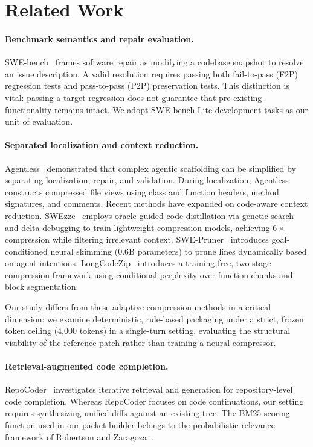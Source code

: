 \documentclass[11pt]{article}
\begin{document}
\section{Related Work}

\paragraph{Benchmark semantics and repair evaluation.}
SWE-bench~\cite{jimenez2024swebench} frames software repair as modifying a
codebase snapshot to resolve an issue description.  A valid resolution
requires passing both fail-to-pass (F2P) regression tests and pass-to-pass
(P2P) preservation tests.  This distinction is vital: passing a target
regression does not guarantee that pre-existing functionality remains
intact.  We adopt SWE-bench Lite development tasks as our unit of
evaluation.

\paragraph{Separated localization and context reduction.}
Agentless~\cite{xia2024agentless} demonstrated that complex agentic
scaffolding can be simplified by separating localization, repair, and
validation.  During localization, Agentless constructs compressed file
views using class and function headers, method signatures, and comments.
Recent methods have expanded on code-aware context reduction.
SWEzze~\cite{jia2026swezze} employs oracle-guided code distillation
via genetic search and delta debugging to train lightweight compression
models, achieving $6\times$ compression while filtering irrelevant context.
SWE-Pruner~\cite{swepruner2026} introduces goal-conditioned neural
skimming (0.6B parameters) to prune lines dynamically based on agent
intentions.  LongCodeZip~\cite{longcodezip2025} introduces a training-free,
two-stage compression framework using conditional perplexity over function
chunks and block segmentation.

Our study differs from these adaptive compression methods in a critical
dimension: we examine deterministic, rule-based packaging under a strict,
frozen token ceiling (4{,}000 tokens) in a single-turn setting, evaluating
the structural visibility of the reference patch rather than training a
neural compressor.

\paragraph{Retrieval-augmented code completion.}
RepoCoder~\cite{zhang2023repocoder} investigates iterative retrieval and
generation for repository-level code completion.  Whereas RepoCoder focuses
on code continuations, our setting requires synthesizing unified diffs
against an existing tree.  The BM25 scoring function used in our packet
builder belongs to the probabilistic relevance framework of Robertson and
Zaragoza~\cite{robertson2009probabilistic}.
\end{document}
